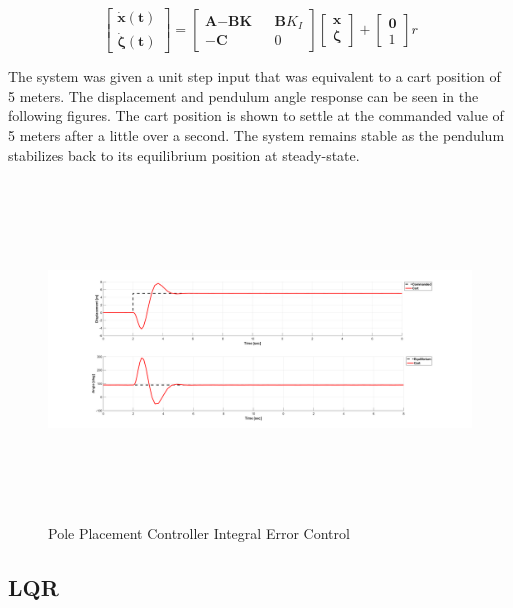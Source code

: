 \documentclass[titlepage]{article}
\begin{document}
\begin{equation}
\begin{bmatrix}
\mathbf{\dot x(t)} \\
\boldsymbol{\dot \zeta(t)}
\end{bmatrix}
=
\begin{bmatrix}
\textbf{A}-\textbf{BK} && \textbf{B}K_{I} \\
-\textbf{C} && 0
\end{bmatrix}
\begin{bmatrix}
\textbf{x} \\
\boldsymbol{\zeta}
\end{bmatrix}
+
\begin{bmatrix}
\textbf{0} \\ 1
\end{bmatrix}
r
\end{equation}

The system was given a unit step input that was equivalent to a cart position of 5 meters. The displacement and pendulum angle response can be seen in the following figures. The cart position is shown to settle at the commanded value of 5 meters after a little over a second. The system remains stable as the pendulum stabilizes back to its equilibrium position at steady-state.

\begin{figure}[H]
\center
\includegraphics[width=15cm, height=9cm]{pole_placement_integral_error.png}
\caption{Pole Placement Controller Integral Error Control}
\end{figure}

\subsection{LQR}
\end{document}
